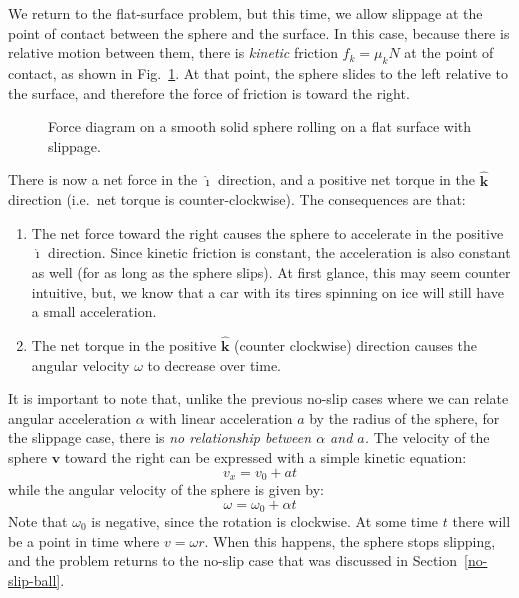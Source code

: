 \documentclass{../../../oss-handout}
\newcommand{\mb}[1]{\mathbf{#1}}
\newcommand{\iii}{\bm{\hat{\imath}}}
\newcommand{\kkk}{\bm{\hat{k}}}
\begin{document}
We return to the flat-surface problem, but this time, we allow slippage at the
point of contact between the sphere and the surface. In this case, because there
is relative motion between them, there is \emph{kinetic} friction $f_k=\mu_kN$
at the point of contact, as shown in Fig.~\ref{slip1}. At that point, the sphere
slides to the left relative to the surface, and therefore the force of friction
is toward the right.
\begin{figure}[!ht]
  \centering
  \caption{Force diagram on a smooth solid sphere rolling on a flat surface with
    slippage.}
  \label{slip1}
\end{figure}

There is now a net force in the $\iii$ direction, and a positive net torque in
the $\kkk$ direction (i.e.\ net torque is counter-clockwise). The consequences
are that:
\begin{enumerate}[topsep=0pt]
\item The net force toward the right causes the sphere to accelerate in the
  positive $\iii$ direction. Since kinetic friction is constant, the
  acceleration is also constant as well (for as long as the sphere slips). At
  first glance, this may seem counter intuitive, but, we know that a car with
  its tires spinning on ice will still have a small acceleration.
\item The net torque in the positive $\kkk$ (counter clockwise) direction
  causes the angular velocity $\omega$ to decrease over time.
\end{enumerate}
It is important to note that, unlike the previous no-slip cases where we can 
relate angular acceleration $\alpha$ with linear acceleration $a$ by the radius
of the sphere, for the slippage case, there is \emph{no relationship between
  $\alpha$ and $a$.} The velocity of the sphere $\mb{v}$ toward the right can
be expressed with a simple kinetic equation:
\begin{equation}
  v_x=v_0+at
\end{equation}
while the angular velocity of the sphere is given by:
\begin{equation}
  \omega=\omega_0+\alpha t
\end{equation}
Note that $\omega_0$ is negative, since the rotation is clockwise. At some time
$t$ there will be a point in time where $v=\omega r$. When this happens, the
sphere stops slipping, and the problem returns to the no-slip case that was
discussed in Section~\ref{no-slip-ball}.
\end{document}
